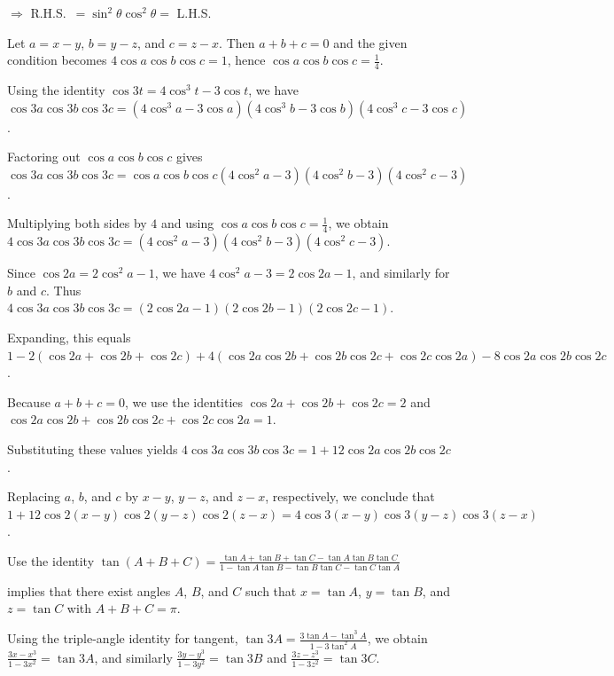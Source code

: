   $\Rightarrow $ R.H.S.\ $= \sin^2\theta\cos^2\theta =$ L.H.S.
\item  Let $a = x - y$, $b = y - z$, and $c = z - x$. Then $a + b + c = 0$ and the given condition becomes
  $4 \cos a \cos b \cos c = 1$, hence $\cos a \cos b \cos c = \frac14$.

  Using the identity $\cos 3t = 4 \cos^3 t - 3 \cos t$, we have
  $\cos 3a \cos 3b \cos 3c
  = (4 \cos^3 a - 3 \cos a)(4 \cos^3 b - 3 \cos b)(4 \cos^3 c - 3 \cos c)$.

  Factoring out $\cos a \cos b \cos c$ gives
  $\cos 3a \cos 3b \cos 3c
  = \cos a \cos b \cos c (4 \cos^2 a - 3)(4 \cos^2 b - 3)(4 \cos^2 c - 3)$.

  Multiplying both sides by $4$ and using $\cos a \cos b \cos c = \frac14$, we obtain
  $4 \cos 3a \cos 3b \cos 3c
  = (4 \cos^2 a - 3)(4 \cos^2 b - 3)(4 \cos^2 c - 3)$.

  Since $\cos 2a = 2 \cos^2 a - 1$, we have $4 \cos^2 a - 3 = 2 \cos 2a - 1$, and similarly for $b$ and $c$.
  Thus
  $4 \cos 3a \cos 3b \cos 3c
  = (2 \cos 2a - 1)(2 \cos 2b - 1)(2 \cos 2c - 1)$.

  Expanding, this equals
  $1 - 2(\cos 2a + \cos 2b + \cos 2c)
  + 4(\cos 2a \cos 2b + \cos 2b \cos 2c + \cos 2c \cos 2a)
  - 8 \cos 2a \cos 2b \cos 2c$.

  Because $a + b + c = 0$, we use the identities
  $\cos 2a + \cos 2b + \cos 2c = 2$
  and
  $\cos 2a \cos 2b + \cos 2b \cos 2c + \cos 2c \cos 2a = 1$.

  Substituting these values yields
  $4 \cos 3a \cos 3b \cos 3c
  = 1 + 12 \cos 2a \cos 2b \cos 2c$.

  Replacing $a$, $b$, and $c$ by $x - y$, $y - z$, and $z - x$, respectively, we conclude that
  $1 + 12 \cos 2(x - y) \cos 2(y - z) \cos 2(z - x)
  = 4 \cos 3(x - y) \cos 3(y - z) \cos 3(z - x)$.
\item Use the identity
  $\tan(A + B + C) = \frac{\tan A + \tan B + \tan C - \tan A \tan B \tan C}
  {1 - \tan A \tan B - \tan B \tan C - \tan C \tan A}$

  implies that there exist angles $A$, $B$, and $C$ such that
  $x = \tan A$, $y = \tan B$, and $z = \tan C$ with $A + B + C = \pi$.

  Using the triple-angle identity for tangent,
  $\tan 3A = \frac{3 \tan A - \tan^3 A}{1 - 3 \tan^2 A}$,
  we obtain
  $\frac{3x - x^3}{1 - 3x^2} = \tan 3A$,
  and similarly
  $\frac{3y - y^3}{1 - 3y^2} = \tan 3B$
  and
  $\frac{3z - z^3}{1 - 3z^2} = \tan 3C$.

